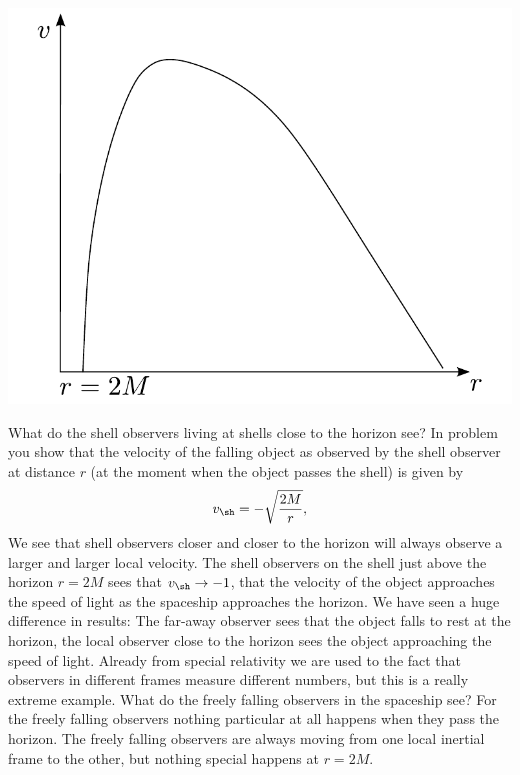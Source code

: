 {\begin{multicols}{2}
\begin{Figure}
\centering
\includegraphics[width=\textwidth]{fig_15-7.pdf}
\end{Figure}




What do the shell observers living at shells close to the horizon see? In problem  you show that  the velocity of the falling object as observed by the shell observer at distance $r$ (at the moment when the object passes the shell) is given by
\[
v_\sh=-\sqrt{\frac{2M}{r}},
\]
We see that shell observers closer and closer to the horizon will always observe a larger and larger local velocity. The shell observers on the shell just above the horizon $r=2M$ sees that $v_\sh\rightarrow-1$, that the velocity of the object approaches the speed of light as the spaceship approaches the horizon. We have seen a huge difference in results: The far-away observer sees that the object falls to rest at the horizon, the local observer close to the horizon sees the object approaching the speed of light. Already from special relativity we are used to the fact that observers in different frames measure different numbers, but this is a really extreme example. What do the freely falling observers in the spaceship see? For the freely falling observers nothing particular at all happens when they pass the horizon. The freely falling observers are always moving from one local inertial frame to the other, but nothing special happens at $r=2M$.


\end{multicols}}
